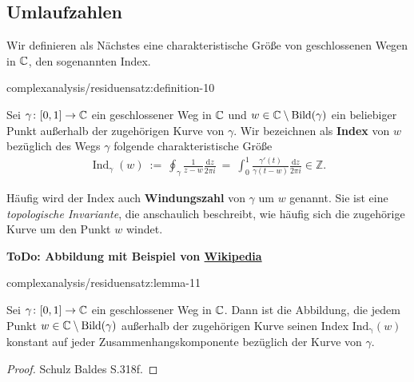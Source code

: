 \subsection{Umlaufzahlen}
\label{\detokenize{complexanalysis/residuensatz:umlaufzahlen}}
\par
Wir definieren als Nächstes eine charakteristische Größe von geschlossenen Wegen in \(\mathbb{C}\), den sogenannten Index.
\begin{definition}{}{complexanalysis/residuensatz:definition-10}



\par
Sei \(\gamma \colon [0,1] \rightarrow \mathbb{C}\) ein geschlossener Weg in \(\mathbb{C}\) und \(w \in \mathbb{C} \setminus \operatorname{Bild}(\gamma)\) ein beliebiger Punkt außerhalb der zugehörigen Kurve von \(\gamma\).
Wir bezeichnen als \textbf{Index} von \(w\) bezüglich des Wegs \(\gamma\) folgende charakteristische Größe
\begin{align*}
\operatorname{Ind}_\gamma(w) \ := \ \oint_\gamma \frac{1}{z - w} \frac{\mathrm{d}z}{2\pi i} \ = \ \int_0^1 \frac{\gamma'(t)}{\gamma(t - w)} \frac{\mathrm{d}z}{2\pi i} \in \mathbb{Z}.
\end{align*}
\par
Häufig wird der Index auch \textbf{Windungszahl} von \(\gamma\) um \(w\) genannt.
Sie ist eine \emph{topologische Invariante}, die anschaulich beschreibt, wie häufig sich die zugehörige Kurve um den Punkt \(w\) windet.
\end{definition}

\par
\textbf{ToDo: Abbildung mit Beispiel von \href{https://de.wikipedia.org/wiki/Umlaufzahl\_(Mathematik)}{Wikipedia}}
\begin{lemma}{}{complexanalysis/residuensatz:lemma-11}



\par
Sei \(\gamma \colon [0,1] \rightarrow \mathbb{C}\) ein geschlossener Weg in \(\mathbb{C}\).
Dann ist die Abbildung, die jedem Punkt \(w \in \mathbb{C} \setminus \operatorname{Bild}(\gamma)\) außerhalb der zugehörigen Kurve seinen Index \(\operatorname{Ind_\gamma}(w)\) konstant auf jeder Zusammenhangskomponente bezüglich der Kurve von \(\gamma\).
\end{lemma}

\begin{proof}
 Schulz Baldes S.318f.
\end{proof}


